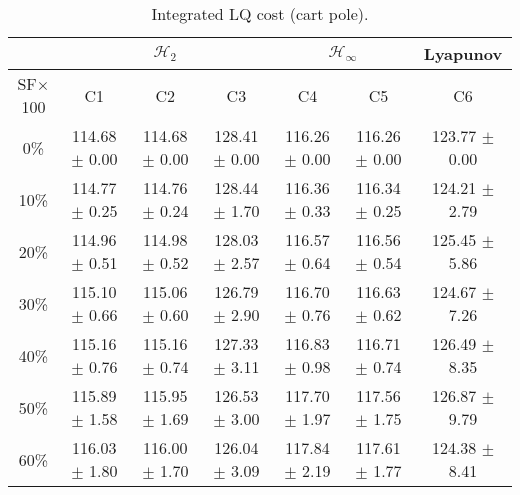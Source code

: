 \begin{table}[H]
\centering
\scriptsize
\begin{tabular}{| c || c | c | c | c | c | c |}
	\hline
	 & \multicolumn{3}{c|}{$\mathcal{H}_{2}$} & \multicolumn{2}{c|}{$\mathcal{H}_{\infty}$} & Lyapunov\\
	\hline
	SF$\times$100 & C1& C2 & C3 & C4 & C5 & C6\\
	\hline\hline
	0\% & 114.68 $\pm$ 0.00 & 114.68 $\pm$ 0.00 & 128.41 $\pm$ 0.00 & 116.26 $\pm$ 0.00 & 116.26 $\pm$ 0.00 & 123.77 $\pm$ 0.00\\
	\hline
	10\% & 114.77 $\pm$ 0.25 & 114.76 $\pm$ 0.24 & 128.44 $\pm$ 1.70 & 116.36 $\pm$ 0.33 & 116.34 $\pm$ 0.25 & 124.21 $\pm$ 2.79\\
	\hline
	20\% & 114.96 $\pm$ 0.51 & 114.98 $\pm$ 0.52 & 128.03 $\pm$ 2.57 & 116.57 $\pm$ 0.64 & 116.56 $\pm$ 0.54 & 125.45 $\pm$ 5.86\\
	\hline
	30\% & 115.10 $\pm$ 0.66 & 115.06 $\pm$ 0.60 & 126.79 $\pm$ 2.90 & 116.70 $\pm$ 0.76 & 116.63 $\pm$ 0.62 & 124.67 $\pm$ 7.26\\
	\hline
	40\% & 115.16 $\pm$ 0.76 & 115.16 $\pm$ 0.74 & 127.33 $\pm$ 3.11 & 116.83 $\pm$ 0.98 & 116.71 $\pm$ 0.74 & 126.49 $\pm$ 8.35\\
	\hline
	50\% & 115.89 $\pm$ 1.58 & 115.95 $\pm$ 1.69 & 126.53 $\pm$ 3.00 & 117.70 $\pm$ 1.97 & 117.56 $\pm$ 1.75 & 126.87 $\pm$ 9.79\\
	\hline
	60\% & 116.03 $\pm$ 1.80 & 116.00 $\pm$ 1.70 & 126.04 $\pm$ 3.09 & 117.84 $\pm$ 2.19 & 117.61 $\pm$ 1.77 & 124.38 $\pm$ 8.41\\
	\hline
\end{tabular}
\caption{Integrated LQ cost (cart pole).}
\label{table:lq_cost_cart_pole:unc}
\end{table}

